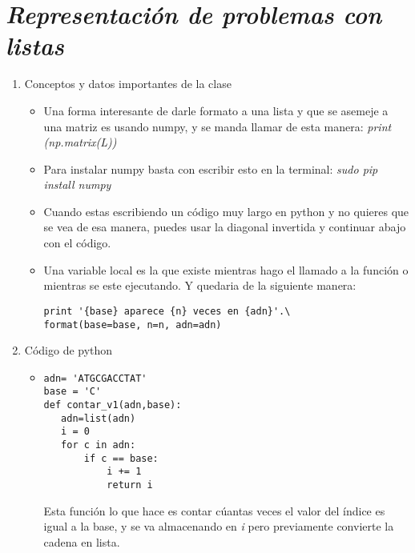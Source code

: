 \documentclass{book}
\begin{document}




\section{\textit{Representación de problemas con listas}}

\begin{flushright}
	\date{24 de enero de 2019\\}
\end{flushright}

\begin{enumerate}
	\item Conceptos y datos importantes de la clase
	\begin{itemize}
		\item Una forma interesante de darle formato a una lista y que se asemeje a una matriz es usando numpy, y se manda llamar de esta manera: \textit{print (np.matrix(L))}\\
		
		
		\item Para instalar numpy basta con escribir esto en la terminal: \textit{sudo pip install numpy}\\
		
		\item Cuando estas escribiendo un código muy largo en python y no quieres que se vea de esa manera, puedes usar la diagonal invertida y continuar abajo con el código.\\
		
		\item Una variable local es la que existe mientras hago el llamado a la función o mientras se este ejecutando. Y quedaria de la siguiente manera:  \begin{lstlisting}
print '{base} aparece {n} veces en {adn}'.\
format(base=base, n=n, adn=adn)
		\end{lstlisting}
		
		
		
	\end{itemize}
	
	
	
	\item Código de python
	\begin{itemize}
		\item \begin{lstlisting}
adn= 'ATGCGACCTAT'
base = 'C'				
def contar_v1(adn,base):
   adn=list(adn)
   i = 0
   for c in adn:
       if c == base:
           i += 1
           return i
		\end{lstlisting} Esta función lo que hace es contar cúantas veces el valor del índice es igual a la base, y se va almacenando en \textit{i} pero previamente convierte la cadena en lista.\\
		

\end{itemize}
\end{enumerate}
\end{document}
